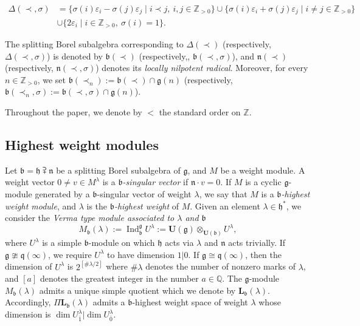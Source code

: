 \documentclass[12pt]{amsart}
\newcommand\Z{\mathbb{Z}}
\newcommand\Q{\mathbb{Q}}
\newcommand\g{\mathfrak{g}}
\newcommand\fq{\mathfrak{q}}
\newcommand\fh{\mathfrak{h}}
\newcommand\fn{\mathfrak{n}}
\newcommand\fb{\mathfrak{b}}
\newcommand\D{\Delta}
\newcommand\bU{\mathbf{U}}
\newcommand\bL{\mathbf{L}}
\DeclareMathOperator{\Ind}{Ind}
\theoremstyle{plain}
\theoremstyle{definition}
\numberwithin{equation}{section}
\begin{document}
\begin{align*}
\D(\prec, \sigma) & = \{\sigma(i)\varepsilon_i - \sigma(j)\varepsilon_j\mid i\prec j,\ i,j\in \Z_{>0}\}\cup \{\sigma(i)\varepsilon_i + \sigma(j)\varepsilon_j\mid i\neq j\in \Z_{>0}\}  \\
& \cup \{2\varepsilon_i \mid i\in \Z_{>0},\ \sigma(i)=1\}.
\end{align*}

The splitting Borel subalgebra corresponding to $\D(\prec)$ (respectively, $\D(\prec, \sigma)$) is denoted by $\fb(\prec)$ (respectively,, $\fb(\prec, \sigma)$), and $\fn(\prec)$ (respectively, $\fn(\prec,\sigma)$) denotes its \emph{locally nilpotent radical}. Moreover, for every $n\in \Z_{>0}$, we set $\fb(\prec_n) :=\fb(\prec)\cap \g(n)$ (respectively, $\fb(\prec_n,\sigma) :=\fb(\prec,\sigma)\cap \g(n)$).

Throughout the paper, we denote by $<$ the standard order on $\Z$.

\subsection{Highest weight modules}
Let $\fb = \fh \supsetplus \fn$ be a splitting Borel subalgebra of $\g$, and $M$ be a weight module. A weight vector $0\neq v\in M^\lambda$ is a \emph{$\fb$-singular vector} if $\fn\cdot v = 0$. If $M$ is a cyclic $\g$-module generated by a $\fb$-singular vector of weight $\lambda$, we say that $M$ is a \emph{$\fb$-highest weight module}, and $\lambda$ is the \emph{$\fb$-highest weight} of $M$. Given an element $\lambda\in \fh^*$, we consider the \emph{Verma type module associated to $\lambda$ and $\fb$}
	\[
M_\fb (\lambda):=\Ind_\fb^\g U^\lambda := \bU(\g)\otimes_{\bU(\fb)} U^\lambda,
	\]
where $U^\lambda$ is a simple $\fb$-module on which $\fh$ acts via $\lambda$ and $\fn$ acts trivially. If $\g\ncong \fq(\infty)$, we require $U^\lambda$ to have dimension $1|0$. If $\g\cong \fq(\infty)$, then the dimension of $U^\lambda$ is $2^{[\# \lambda/2]}$ where $\# \lambda$ denotes the number of nonzero marks of $\lambda$, and $[a]$ denotes the greatest integer in the number $a\in \Q$. The $\g$-module $M_\fb(\lambda)$ admits a unique simple quotient which we denote by $\bL_{\fb}(\lambda)$. Accordingly, $\Pi \bL_{\fb}(\lambda)$ admits a $\fb$-highest weight space of weight $\lambda$ whose dimension is $\dim U^\lambda_{\bar 1}|\dim U^\lambda_{\bar 0}$. 
\end{document}
